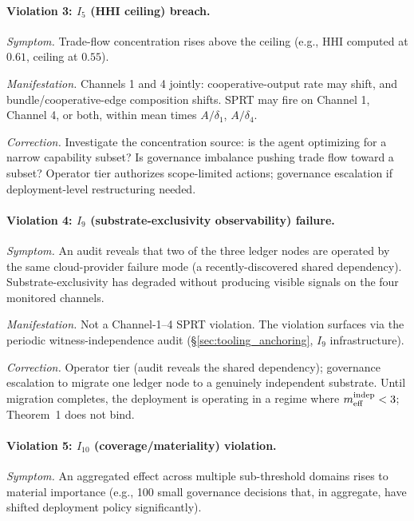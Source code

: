 \paragraph{Violation 3: \texorpdfstring{$I_5$}{I5} (HHI ceiling) breach.}

\emph{Symptom.}  Trade-flow concentration rises above the ceiling
(e.g., HHI computed at $0.61$, ceiling at $0.55$).

\emph{Manifestation.}  Channels 1 and 4 jointly: cooperative-output
rate may shift, and bundle/cooperative-edge composition shifts.
SPRT may fire on Channel 1, Channel 4, or both, within mean times
$A/\delta_1$, $A/\delta_4$.

\emph{Correction.}  Investigate the concentration source: is the
agent optimizing for a narrow capability subset? Is governance
imbalance pushing trade flow toward a subset? Operator tier
authorizes scope-limited actions; governance escalation if
deployment-level restructuring needed.

\paragraph{Violation 4: \texorpdfstring{$I_9$}{I9} (substrate-exclusivity observability) failure.}

\emph{Symptom.}  An audit reveals that two of the three ledger nodes are
operated by the same cloud-provider failure mode (a recently-discovered shared
dependency). Substrate-exclusivity has degraded without producing visible
signals on the four monitored channels.

\emph{Manifestation.}  Not a Channel-1--4 SPRT violation. The
violation surfaces via the periodic witness-independence audit
(\S\ref{sec:tooling_anchoring}, $I_9$ infrastructure).

\emph{Correction.}  Operator tier (audit reveals the shared
dependency); governance escalation to migrate one ledger node to a
genuinely independent substrate. Until migration completes, the
deployment is operating in a regime where $m_{\mathrm{eff}}^{\mathrm{indep}} < 3$; Theorem~1
does not bind.

\paragraph{Violation 5: \texorpdfstring{$I_{10}$}{I{10}} (coverage/materiality) violation.}

\emph{Symptom.}  An aggregated effect across multiple sub-threshold
domains rises to material importance (e.g., 100 small governance
decisions that, in aggregate, have shifted deployment policy
significantly).

